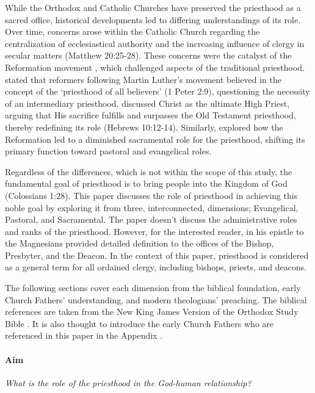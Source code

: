 \documentclass[12pt,doc]{apa7}   	%
\begin{document}
While the Orthodox and Catholic Churches have preserved the priesthood as a sacred office, historical developments led to differing understandings of its role. Over time, concerns arose within the Catholic Church regarding the centralization of ecclesiastical authority and the increasing influence of clergy in secular matters (Matthew 20:25-28). These concerns were the catalyst of the Reformation movement \citep{reformation_lutzer}, which challenged aspects of the traditional priesthood.  \citet{reformation_lull_nelson} stated that reformers following Martin Luther's movement believed in the concept of the ‘priesthood of all believers’ (1 Peter 2:9), questioning the necessity of an intermediary priesthood. \citet{hebrews_wright} discussed Christ as the ultimate High Priest, arguing that His sacrifice fulfills and surpasses the Old Testament priesthood, thereby redefining its role (Hebrews 10:12-14). Similarly, \citet{reformation_macCulloch} explored how the Reformation led to a diminished sacramental role for the priesthood, shifting its primary function toward pastoral and evangelical roles.

Regardless of the differences, which is not within the scope of this study, the fundamental goal of priesthood is to bring people into the Kingdom of God (Colossians 1:28). This paper discusses the role of priesthood in achieving this noble goal by exploring it from three, interconnected, dimensions; Evangelical, Pastoral, and Sacramental.  The paper doesn't discuss the administrative roles and ranks of the priesthood.  However, for the interested reader, \citet{epistles_ignatius} in his epistle to the Magnesians provided detailed definition to the offices of the Bishop, Presbyter, and the Deacon.  In the context of this paper, priesthood is considered as a general term for all ordained clergy, including bishops, priests, and deacons.

The following sections cover each dimension from the biblical foundation, early Church Fathers' understanding, and modern theologians' preaching.  The biblical references are taken from the New King James Version of the Orthodox Study Bible \citep{nelson_nkjv}. It is also thought to introduce the early Church Fathers who are referenced in this paper in the Appendix \citep{early_church_akin}.

\vskip 0.5cm
\paragraph{Aim}  \emph{What is the role of the priesthood in the God-human relationship?}
\end{document}
